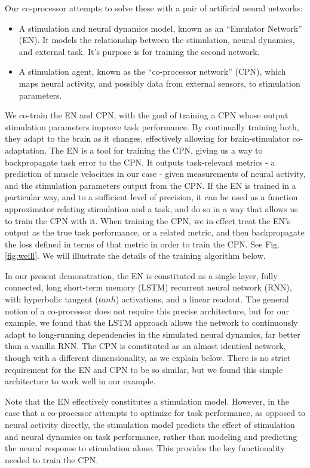 \documentclass[12pt]{iopart}
\begin{document}
Our co-processor attempts to solve these with a pair of artificial neural networks:
\begin{itemize}
	\item A stimulation and neural dynamics model, known as an ``Emulator Network'' (EN). It models the relationship
	      between the stimulation, neural dynamics, and external task. It's purpose is for training the second network.
	\item A stimulation agent, known as the ``co-processor network'' (CPN), which maps neural activity, and possibly
	      data from external sensors, to stimulation parameters.
\end{itemize}

We co-train the EN and CPN, with the goal of training a CPN whose output stimulation parameters
improve task performance. By continually training both, they adapt to the brain as it changes,
effectively allowing for brain-stimulator co-adaptation. The EN is a tool for training the CPN,
giving us a way to backpropagate task error to the CPN. It outputs task-relevant
metrics - a prediction of muscle velocities in our case - given measurements of neural
activity, and the stimulation parameters output from the CPN. If the EN is trained in a
particular way, and to a sufficient level of precision, it can be used as a function
approximator relating stimulation and a task, and do so in a way that allows us to train
the CPN with it. When training the CPN, we in-effect treat the EN's output as the true
task performance, or a related metric, and then backpropagate the loss defined in terms
of that metric in order to train the CPN. See Fig. \ref{fig:weill}. We will illustrate the details
of the training algorithm below.

In our present demonstration, the EN is constituted as a single layer, fully connected,
long short-term memory (LSTM) recurrent neural network (RNN), with hyperbolic tangent ($tanh$)
activations, and a linear readout. The general notion of a co-processor does
not require this precise architecture, but for our example, we found that the LSTM
approach allows the network to continuously adapt to long-running dependencies in
the simulated neural dynamics, far better than a vanilla RNN. The CPN is constituted
as an almost identical network, though with a different dimensionality, as we explain
below. There is no strict requirement for the EN and CPN to be so similar, but we
found this simple architecture to work well in our example.

Note that the EN effectively constitutes a stimulation model. However, in the case that
a co-processor attempts to optimize for task performance, as opposed to neural
activity directly, the stimulation model predicts the effect of stimulation and neural
dynamics on task performance, rather than modeling and predicting the neural response
to stimulation alone. This provides the key functionality needed to train the CPN.
\end{document}
